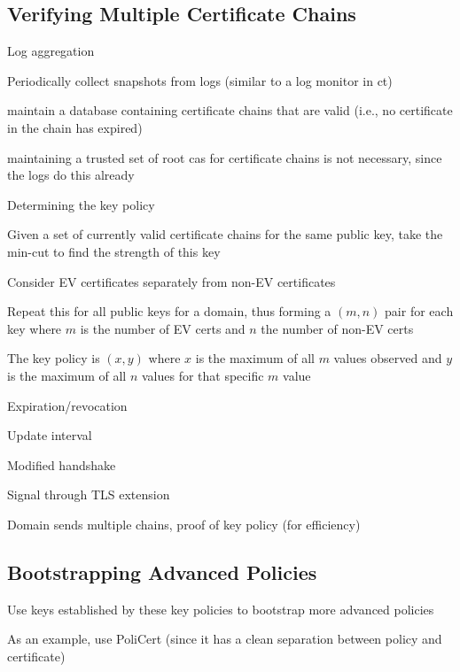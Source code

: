 \subsection{Verifying Multiple Certificate Chains}
\label{sec:design:verifying}

\begin{compactitem}
\item Log aggregation
  \begin{compactitem}
  \item Periodically collect snapshots from logs (similar to a log monitor in
    \ac{ct})
  \item maintain a database containing certificate chains that are valid (i.e.,
    no certificate in the chain has expired)
  \item maintaining a trusted set of root \acp{ca} for certificate chains is not
    necessary, since the logs do this already
  \end{compactitem}
\item Determining the key policy
  \begin{compactitem}
  \item Given a set of currently valid certificate chains for the same public
    key, take the min-cut to find the strength of this key
  \item Consider EV certificates separately from non-EV certificates
  \item Repeat this for all public keys for a domain, thus forming a $(m, n)$
    pair for each key where $m$ is the number of EV certs and $n$ the number of
    non-EV certs
  \item The key policy is $(x, y)$ where $x$ is the maximum of all $m$ values
    observed and $y$ is the maximum of all $n$ values for that specific $m$
    value
  \end{compactitem}
\item Expiration/revocation
\item Update interval
\item Modified handshake
  \begin{compactitem}
  \item Signal through TLS extension
  \item Domain sends multiple chains, proof of key policy (for efficiency)
  \end{compactitem}
\end{compactitem}

\subsection{Bootstrapping Advanced Policies}
\label{sec:design:bootstrapping}

\begin{compactitem}
\item Use keys established by these key policies to bootstrap more advanced
  policies
\item As an example, use PoliCert (since it has a clean separation between
  policy and certificate)
\end{compactitem}
